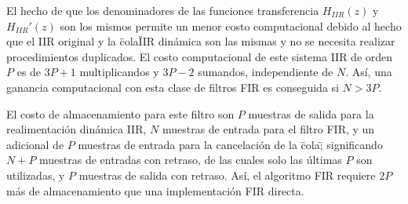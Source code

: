     El hecho de que los denominadores de las funciones transferencia $H_{IIR}(z)$ y $H_{IIR}'(z)$ son los mismos permite un menor costo computacional debido al hecho que el IIR original y la \"cola\" IIR dinámica son las mismas y no se necesita realizar procedimientos duplicados. El costo computacional de este sistema IIR de orden $P$ es de $3P+1$ multiplicandos y $3P-2$ sumandos, independiente de $N$. Así, una ganancia computacional con esta clase de filtros FIR es conseguida si $N>3P$.

    El costo de almacenamiento para este filtro son $P$ muestras de salida para la realimentación dinámica IIR, $N$ muestras de entrada para el filtro FIR, y un adicional de $P$ muestras de entrada para la cancelación de la \"cola\"; significando $N+P$ muestras de entradas con retraso, de las cuales solo las últimas $P$ son utilizadas, y $P$ muestras de salida con retraso. Así, el algoritmo FIR requiere $2P$ más de almacenamiento que una implementación FIR directa.

